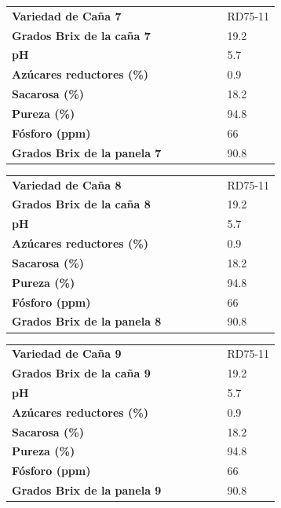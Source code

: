 \documentclass{article}%
\begin{document}
\linebreak%
\newline%
%
\linebreak%
\begin{tabular}{lcccccl}%
\textbf{Variedad de Caña 7}& & & & & &RD75{-}11\\%
\textbf{Grados Brix de la caña 7}& & & & & &19.2\\%
\textbf{pH}& & & & & &5.7\\%
\textbf{Azúcares reductores (\%)}& & & & & &0.9\\%
\textbf{Sacarosa (\%)}& & & & & &18.2\\%
\textbf{Pureza (\%)}& & & & & &94.8\\%
\textbf{Fósforo (ppm)}& & & & & &66\\%
\textbf{Grados Brix de la panela 7}& & & & & &90.8\\%
\end{tabular}%
\linebreak%
\newline%
%
\linebreak%
\begin{tabular}{lcccccl}%
\textbf{Variedad de Caña 8}& & & & & &RD75{-}11\\%
\textbf{Grados Brix de la caña 8}& & & & & &19.2\\%
\textbf{pH}& & & & & &5.7\\%
\textbf{Azúcares reductores (\%)}& & & & & &0.9\\%
\textbf{Sacarosa (\%)}& & & & & &18.2\\%
\textbf{Pureza (\%)}& & & & & &94.8\\%
\textbf{Fósforo (ppm)}& & & & & &66\\%
\textbf{Grados Brix de la panela 8}& & & & & &90.8\\%
\end{tabular}%
\linebreak%
\newline%
%
\linebreak%
\begin{tabular}{lcccccl}%
\textbf{Variedad de Caña 9}& & & & & &RD75{-}11\\%
\textbf{Grados Brix de la caña 9}& & & & & &19.2\\%
\textbf{pH}& & & & & &5.7\\%
\textbf{Azúcares reductores (\%)}& & & & & &0.9\\%
\textbf{Sacarosa (\%)}& & & & & &18.2\\%
\textbf{Pureza (\%)}& & & & & &94.8\\%
\textbf{Fósforo (ppm)}& & & & & &66\\%
\textbf{Grados Brix de la panela 9}& & & & & &90.8\\%
\end{tabular}%
\linebreak%
\newline%
%
\linebreak%
\end{document}
